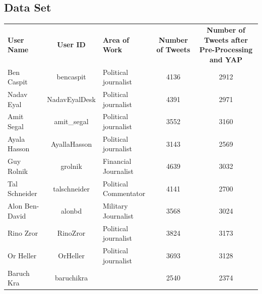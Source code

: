 \documentclass[a4paper]{article}
\begin{document}
\begin{appendices}
\section{Data Set}
\label{apx:data set}
\begin{table}[htbp]
  \centering
    \begin{tabular}{lcp{5.715em}cc}
    \textbf{User Name} & \multicolumn{1}{p{7.57em}}{\textbf{User ID}} & \textbf{Area of Work} & \multicolumn{1}{p{5.57em}}{\textbf{Number of Tweets}} & 		\multicolumn{1}{p{12.855em}}{\textbf{Number of Tweets after Pre-Processing and YAP}} \\
    Ben Caspit & \multicolumn{1}{p{7.57em}}{bencaspit} & Political journalist & 4136  & 2912 \\
    Nadav Eyal & \multicolumn{1}{p{7.57em}}{NadavEyalDesk} & Political journalist & 4391  & 2971 \\
    Amit Segal & \multicolumn{1}{p{7.57em}}{amit\_segal} & Political journalist & 3552  & 3160 \\
    Ayala Hasson & \multicolumn{1}{p{7.57em}}{AyallaHasson} & Political journalist & 3143  & 2569 \\
    Guy Rolnik & \multicolumn{1}{p{7.57em}}{grolnik} & Financial Journalist & 4639  & 3032 \\
    Tal Schneider & \multicolumn{1}{p{7.57em}}{talschneider} & Political Commentator & 4141  & 2700 \\
    Alon Ben-David & \multicolumn{1}{p{7.57em}}{alonbd} & Military Journalist & 3568  & 3024 \\
    Rino Zror & \multicolumn{1}{p{7.57em}}{RinoZror} & Political journalist & 3824  & 3173 \\
    Or Heller & \multicolumn{1}{p{7.57em}}{OrHeller} & Political journalist & 3693  & 3128 \\
    Baruch Kra & \multicolumn{1}{p{7.57em}}{baruchikra} & \multicolumn{1}{r}{} & 2540  & 2374 \\

\end{tabular}
\end{table}
\end{appendices}
\end{document}
